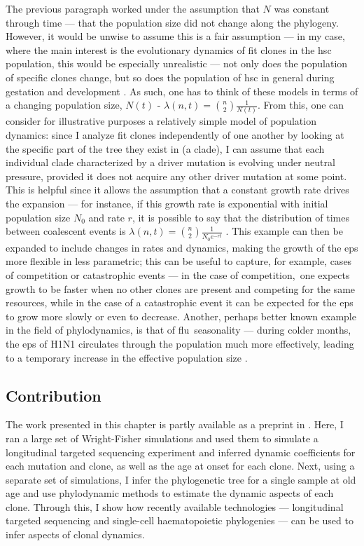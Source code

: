 The previous paragraph worked under the assumption that $N$ was constant through time --- that the population size did not change along the phylogeny. However, it would be unwise to assume this is a fair assumption --- in my case, where the main interest is the evolutionary dynamics of fit clones in the \ac{hsc} population, this would be especially unrealistic --- not only does the population of specific clones change, but so does the population of \ac{hsc} in general during gestation and development \cite{Lee-Six2018-lp}. As such, one has to think of these models in terms of a changing population size, $N(t)$ - $\lambda(n,t) = \binom{n}{2}\frac{1}{N(t)}$. From this, one can consider for illustrative purposes a relatively simple model of population dynamics: since I analyze fit clones independently of one another by looking at the specific part of the tree they exist in (a clade), I can assume that each individual clade characterized by a driver mutation is evolving under neutral pressure, provided it does not acquire any other driver mutation at some point. This is helpful since it allows the assumption that a constant growth rate drives the expansion --- for instance, if this growth rate is exponential with initial population size $N_0$ and rate $r$, it is possible to say that the distribution of times between coalescent events is $\lambda(n,t) = \binom{n}{2}\frac{1}{N_0 e^{-rt}}$ \cite{Volz2013-ey}. This example can then be expanded to include changes in rates and dynamics, making the growth of the \ac{eps} more flexible in less parametric; this can be useful to capture, for example, cases of competition or catastrophic events --- in the case of competition, one expects growth to be faster when no other clones are present and competing for the same resources, while in the case of a catastrophic event it can be expected for the \ac{eps} to grow more slowly or even to decrease. Another, perhaps better known example in the field of phylodynamics, is that of flu seasonality --- during colder months, the \ac{eps} of H1N1 circulates through the population much more effectively, leading to a temporary increase in the effective population size \cite{Karcher2020-bg}. 

\subsection{Contribution}

The work presented in this chapter is partly available as a preprint in \cite{Fabre2021-uw}. Here, I ran a large set of Wright-Fisher simulations and used them to simulate a longitudinal targeted sequencing experiment and inferred dynamic coefficients for each mutation and clone, as well as the age at onset for each clone. Next, using a separate set of simulations, I infer the phylogenetic tree for a single sample at old age and use phylodynamic methods to estimate the dynamic aspects of each clone. Through this, I show how recently available technologies --- longitudinal targeted sequencing and single-cell haematopoietic phylogenies --- can be used to infer aspects of clonal dynamics.

